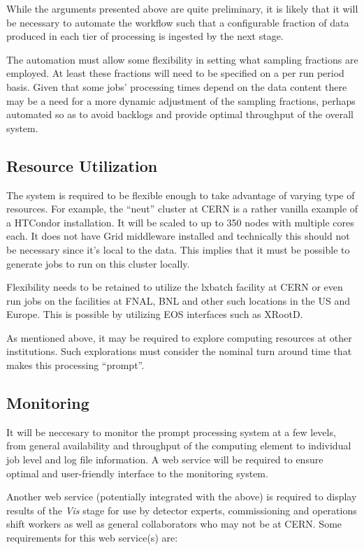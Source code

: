 \documentclass[pdftex,12pt,letter]{article}
\begin{document}
While the arguments presented above are quite preliminary, it is likely that it will be necessary to automate
the workflow such that a configurable fraction of data produced in each tier of processing is ingested by the next stage.

The automation must allow some flexibility in setting what
sampling fractions are employed.  At least these
fractions will need to be specified on a per run period basis.  Given
that some jobs' processing times depend on the data content there may
be a need for a more dynamic adjustment of the sampling fractions, perhaps
automated so as to avoid backlogs and provide optimal throughput of the
overall system.

\subsection{Resource Utilization}
The system is required to be flexible enough to take advantage of varying type of resources. For example, the ``neut'' cluster at CERN
is a rather vanilla example of a HTCondor installation. It will be scaled to up to 350 nodes with multiple cores each. It does not have Grid middleware
installed and technically this should not be necessary since it's local to the data. This implies that it must be possible to generate jobs to
run on this cluster locally.

Flexibility needs to be retained to utilize the lxbatch facility at CERN or even run jobs on the facilities at FNAL, BNL and other such locations
in the US and Europe. This is possible by utilizing EOS interfaces such as XRootD.

As mentioned above, it may be required to explore computing resources
at other institutions.  Such explorations must consider the nominal
turn around time that makes this processing ``prompt''.

\subsection{Monitoring}
It will be neccesary to monitor the prompt processing system at a few
levels, from general availability and throughput of the computing
element to individual job level and log file information.  A web
service will be required to ensure optimal and user-friendly interface
to the monitoring system.

Another web service (potentially integrated with the above) is
required to display results of the \textit{Vis} stage for use by
detector experts, commissioning and operations shift workers as well
as general collaborators who may not be at CERN.  Some requirements
for this web service(s) are:
\end{document}
